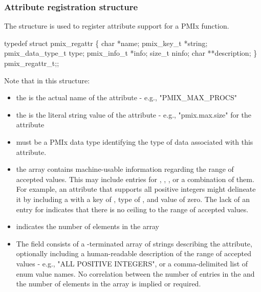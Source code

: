 \subsubsection{Attribute registration structure}

The  structure is used to register attribute support for a \ac{PMIx} function.

\cspecificstart
\begin{codepar}
typedef struct pmix_regattr \{
    char *name;
    pmix_key_t *string;
    pmix_data_type_t type;
    pmix_info_t *info;
    size_t ninfo;
    char **description;
\} pmix_regattr_t;;
\end{codepar}
\cspecificend

Note that in this structure:

\begin{itemize}
    \item the  is the actual name of the attribute - e.g., "PMIX_MAX_PROCS"
    \item the  is the literal string value of the attribute - e.g., "pmix.max.size" for the  attribute
    \item {} must be a \ac{PMIx} data type identifying the type of data associated with this attribute.
    \item the  array contains machine-usable information regarding the range of accepted values. This may include entries for , , , or a combination of them. For example, an attribute that supports all positive integers might delineate it by including a  with a key of , type of , and value of zero. The lack of an entry for  indicates that there is no ceiling to the range of accepted values.
    \item {} indicates the number of elements in the  array
    \item The  field consists of a -terminated array of strings describing the attribute, optionally including a human-readable description of the range of accepted values - e.g., "ALL POSITIVE INTEGERS", or a comma-delimited list of enum value names. No correlation between the number of entries in the  and the number of elements in the  array is implied or required.
\end{itemize}

